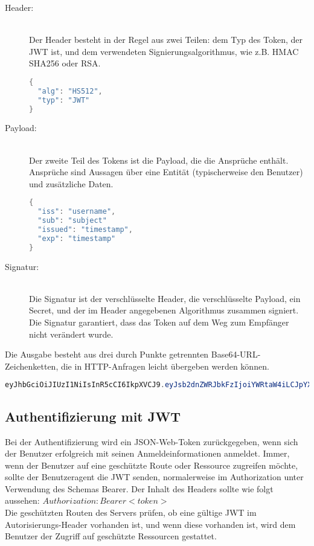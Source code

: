 \begin{description}
  \item[Header:] \hfill \\ Der Header besteht in der Regel aus zwei Teilen: dem Typ des Token, der JWT ist, und dem verwendeten Signierungsalgorithmus, wie z.B. HMAC SHA256 oder RSA. \\
  \begin{lstlisting}[language=JAVA,caption= {JWT Header}]
{
  "alg": "HS512",
  "typ": "JWT"
}
\end{lstlisting} 
  \item[Payload:] \hfill \\ Der zweite Teil des Tokens ist die Payload, die die Ansprüche enthält. Ansprüche sind Aussagen über eine Entität (typischerweise den Benutzer) und zusätzliche Daten. \\
  \begin{lstlisting}[language=JAVA,caption= {JWT Payload}]
{
  "iss": "username",
  "sub": "subject"
  "issued": "timestamp",
  "exp": "timestamp"
}
\end{lstlisting} 
  \item[Signatur:] \hfill \\ Die Signatur ist der verschlüsselte Header, die verschlüsselte Payload, ein Secret, und der im Header angegebenen Algorithmus zusammen signiert. Die Signatur garantiert, dass das Token auf dem Weg zum Empfänger nicht verändert wurde.\\
\end{description}

Die Ausgabe besteht aus drei durch Punkte getrennten Base64-URL-Zeichenketten, die in HTTP-Anfragen leicht übergeben werden können. 

\begin{lstlisting}[language=JAVA,caption= {Base64 kodierte JWT}]
eyJhbGciOiJIUzI1NiIsInR5cCI6IkpXVCJ9.eyJsb2dnZWRJbkFzIjoiYWRtaW4iLCJpYXQiOjE0MjI3Nzk2Mzh9.gzSraSYS8EXBxLN_oWnFSRgCzcmJmMjLiuyu5CSpyHI
\end{lstlisting} 

\subsection{Authentifizierung mit JWT}
Bei der Authentifizierung wird ein JSON-Web-Token zurückgegeben, wenn sich der Benutzer erfolgreich mit seinen Anmeldeinformationen anmeldet. 
Immer, wenn der Benutzer auf eine geschützte Route oder Ressource zugreifen möchte, sollte der Benutzeragent die JWT senden, normalerweise im Authorization unter Verwendung des Schemas Bearer. Der Inhalt des Headers sollte wie folgt aussehen: $Authorization: Bearer <token>$\\
Die geschützten Routen des Servers prüfen, ob eine gültige JWT im Autorisierungs-Header vorhanden ist, und wenn diese vorhanden ist, wird dem Benutzer der Zugriff auf geschützte Ressourcen gestattet.

